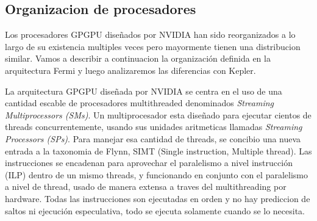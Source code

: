\subsection{Organizacion de procesadores}

Los procesadores GPGPU dise\~nados por NVIDIA han sido reorganizados a lo largo de su
existencia multiples veces pero mayormente tienen una distribucion similar. Vamos a describir a continuacion
la organizaci\'on definida en la arquitectura Fermi y luego analizaremos las diferencias con Kepler.

La arquitectura GPGPU dise\~nada por NVIDIA se centra en el uso de una cantidad escable de procesadores
multithreaded denominados \textit{Streaming Multiprocessors (SMs)}. Un multiprocesador esta dise\~nado
para ejecutar cientos de threads concurrentemente, usando sus unidades aritmeticas llamadas \textit{Streaming
Processors (SPs)}. Para manejar esa cantidad de threads, se concibio una nueva entrada a la taxonomia de Flynn,
SIMT (Single instruction, Multiple thread). Las instrucciones se encadenan para aprovechar el paralelismo
a nivel instrucci\'on (ILP) dentro de un mismo threads, y funcionando en conjunto con el paralelismo
a nivel de thread, usado de manera extensa a traves del multithreading por hardware. Todas las instrucciones
son ejecutadas en orden y no hay prediccion de saltos ni ejecuci\'on especulativa, todo se ejecuta solamente
cuando se lo necesita. ~\cite{CudaOverview}


